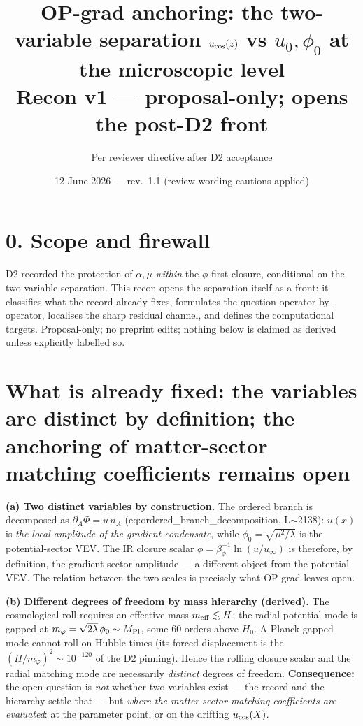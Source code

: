 \documentclass[11pt,a4paper]{article}
\title{\textbf{OP-grad anchoring: the two-variable separation
$u_{\rm cos}(z)$ vs $u_0,\phi_0$ at the microscopic level}\\\large Recon v1 ---
proposal-only; opens the post-D2 front}
\author{Per reviewer directive after D2 acceptance}
\date{12 June 2026 --- rev.~1.1 (review wording cautions applied)}
\begin{document}
\maketitle

\section*{0. Scope and firewall}
D2 recorded the protection of $\alpha,\mu$ \emph{within} the $\phi$-first
closure, conditional on the two-variable separation. This recon opens the
separation itself as a front: it classifies what the record already fixes,
formulates the question operator-by-operator, localises the sharp residual
channel, and defines the computational targets. Proposal-only; no preprint
edits; nothing below is claimed as derived unless explicitly labelled so.

\section{What is already fixed: the variables are distinct by definition; the
anchoring of matter-sector matching coefficients remains open}
\textbf{(a) Two distinct variables by construction.} The ordered branch is
decomposed as $\partial_A\Phi=u\,n_A$ (eq:ordered\_branch\_decomposition,
L$\sim$2138): $u(x)$ is \emph{the local amplitude of the gradient condensate},
while $\phi_0=\sqrt{\mu^2/\lambda}$ is the potential-sector VEV. The IR closure
scalar $\phi=\beta_\phi^{-1}\ln(u/u_\infty)$ is therefore, by definition, the
gradient-sector amplitude --- a different object from the potential VEV. The
relation between the two scales is precisely what OP-grad leaves open.

\textbf{(b) Different degrees of freedom by mass hierarchy (derived).} The
cosmological roll requires an effective mass $m_{\rm eff}\lesssim H$; the radial
potential mode is gapped at $m_\varphi=\sqrt{2\lambda}\,\phi_0\sim M_{\rm Pl}$,
some $60$ orders above $H_0$. A Planck-gapped mode cannot roll on Hubble times
(its forced displacement is the $(H/m_\varphi)^2\sim10^{-120}$ of the D2
pinning). Hence the rolling closure scalar and the radial matching mode are
necessarily \emph{distinct} degrees of freedom. \textbf{Consequence:} the open
question is \emph{not} whether two variables exist --- the record and the
hierarchy settle that --- but \emph{where the matter-sector matching
coefficients are evaluated}: at the parameter point, or on the drifting
$u_{\rm cos}(X)$.
\end{document}
